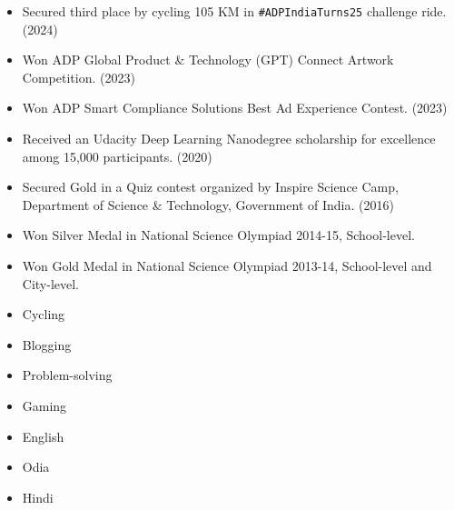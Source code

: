 \documentclass[9pt]{util} %
\begin{document}
\begin{minipage}[t]{0.725\textwidth}
	\vspace{-6pt}
    \begin{itemize}[noitemsep,topsep=0pt,parsep=0pt,partopsep=0pt, leftmargin=-1pt]
    \item Secured third place by cycling 105 KM in \texttt{\#ADPIndiaTurns25} challenge ride. (2024)
    \item Won ADP Global Product \& Technology (GPT) Connect Artwork Competition. (2023)
    \item Won ADP Smart Compliance Solutions Best Ad Experience Contest. (2023)
    \item Received an Udacity Deep Learning Nanodegree scholarship for excellence among 15,000 participants. (2020)
    \item Secured Gold in a Quiz contest organized by Inspire Science Camp, Department of Science \& Technology, Government of India. (2016)
    \item Won Silver Medal in National Science Olympiad 2014-15, School-level.
    \item Won Gold Medal in National Science Olympiad 2013-14, School-level and City-level.
    \end{itemize}
\end{minipage}
\hfill
\begin{minipage}[t]{0.225\textwidth}
    \begin{minipage}[t]{1\textwidth}
    	\vspace{-6pt}
        \begin{itemize}[noitemsep,topsep=0pt,parsep=0pt,partopsep=0pt, leftmargin=-1pt]
        \item Cycling
        \item Blogging
        \item Problem-solving
        \item Gaming
        \end{itemize}
    \end{minipage}
    \begin{minipage}[t]{1\textwidth}
    	\vspace{-6pt}
    	\begin{itemize}[noitemsep,topsep=0pt,parsep=0pt,partopsep=0pt, leftmargin=-1pt]
        \item English
        \item Odia
        \item Hindi
        \end{itemize}
    \end{minipage}
\end{minipage}
\end{document}
